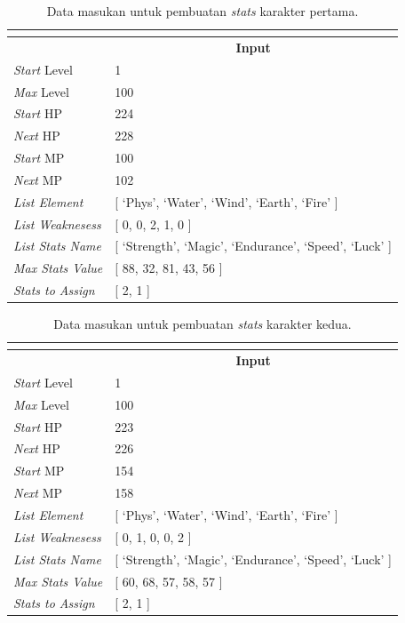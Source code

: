 \begin{longtable}{|l|l|}
	\caption{Data masukan untuk pembuatan \textit{stats} karakter pertama.}
	\vspace{1ex}
	\label{tb:player_input_variable_eval_1}\\
	\hline
	\rowcolor[HTML]{9B9B9B}
	\multicolumn{1}{|c|}{\cellcolor[HTML]{9B9B9B}\textbf{Variabel}} & \multicolumn{1}{c|}{\cellcolor[HTML]{9B9B9B}\textbf{Input}} \\ \hline
	\textit{Start} Level & 1 \\ \hline
	\textit{Max} Level & 100 \\ \hline
	\textit{Start} HP & 224 \\ \hline
	\textit{Next} HP & 228 \\ \hline
	\textit{Start} MP & 100 \\ \hline
	\textit{Next} MP & 102 \\ \hline
	\textit{List Element} & {[} `Phys', `Water', `Wind', `Earth', `Fire' {]} \\ \hline
	\textit{List Weaknesess} & {[} 0, 0, 2, 1, 0 {]} \\ \hline
	\textit{List Stats Name} & {[} `Strength', `Magic', `Endurance', `Speed', `Luck' {]} \\ \hline
	\textit{Max Stats Value} & {[} 88, 32, 81, 43, 56 {]} \\ \hline
	\textit{Stats to Assign} & {[} 2, 1 {]} \\ \hline
\end{longtable}
\vspace{-1ex}

\begin{longtable}{|l|l|}
	\caption{Data masukan untuk pembuatan \textit{stats} karakter kedua.}
	\vspace{1ex}
	\label{tb:player_input_variable_eval_2}\\
	\hline
	\rowcolor[HTML]{9B9B9B} 
	\multicolumn{1}{|c|}{\cellcolor[HTML]{9B9B9B}\textbf{Variabel}} & \multicolumn{1}{c|}{\cellcolor[HTML]{9B9B9B}\textbf{Input}} \\ \hline
	\textit{Start} Level & 1 \\ \hline
	\textit{Max} Level & 100 \\ \hline
	\textit{Start} HP & 223 \\ \hline
	\textit{Next} HP & 226 \\ \hline
	\textit{Start} MP & 154 \\ \hline
	\textit{Next} MP & 158 \\ \hline
	\textit{List Element} & {[} `Phys', `Water', `Wind', `Earth', `Fire' {]} \\ \hline
	\textit{List Weaknesess} & {[} 0, 1, 0, 0, 2 {]} \\ \hline
	\textit{List Stats Name} & {[} `Strength', `Magic', `Endurance', `Speed', `Luck' {]} \\ \hline
	\textit{Max Stats Value} & {[} 60, 68, 57, 58, 57 {]} \\ \hline
	\textit{Stats to Assign} & {[} 2, 1 {]} \\ \hline
\end{longtable}
\vspace{1ex}

